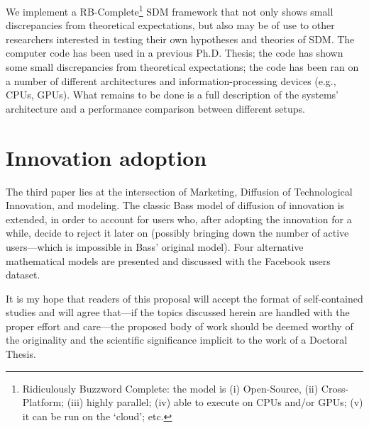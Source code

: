 We implement a RB-Complete\footnote{Ridiculously Buzzword Complete: the model is (i) Open-Source, (ii) Cross-Platform; (iii) highly parallel; (iv) able to execute on CPUs and/or GPUs; (v) it can be run on the `cloud'; etc.} SDM framework that not only shows small discrepancies from theoretical expectations, but also may be of use to other researchers interested in testing their own hypotheses and theories of SDM. The computer code has been used in a previous Ph.D. Thesis; the code has shown some small discrepancies from theoretical expectations; the code has been ran on a number of different architectures and information-processing devices (e.g., CPUs, GPUs).  What remains to be done is a full description of the systems' architecture and a performance comparison between different setups.

\section{Innovation adoption}

The third paper lies at the intersection of Marketing, Diffusion of Technological Innovation, and modeling. The classic Bass model of diffusion of innovation is extended, in order to account for users who, after adopting the innovation for a while, decide to reject it later on (possibly bringing down the number of active users---which is impossible in Bass' original model). Four alternative mathematical models are presented and discussed with the Facebook users dataset. %


It is my hope that readers of this proposal will accept the format of self-contained studies and will agree that---if the topics discussed herein are handled with the proper effort and care---the proposed body of work should be deemed worthy of the originality and the scientific significance implicit to the work of a Doctoral Thesis.
